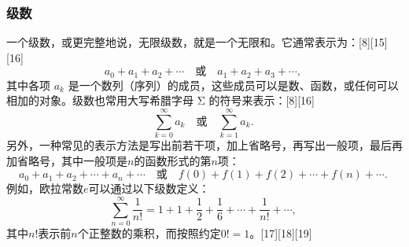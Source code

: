 \subsubsection{级数}
一个级数，或更完整地说，无限级数，就是一个无限和。它通常表示为：[8][15][16]
$$
a_{0} + a_{1} + a_{2} + \cdots \quad \text{或} \quad a_{1} + a_{2} + a_{3} + \cdots ,~
$$
其中各项 $a_{k}$ 是一个数列（序列）的成员，这些成员可以是数、函数，或任何可以相加的对象。级数也常用大写希腊字母 Σ 的符号来表示：[8][16]
$$
\sum_{k=0}^{\infty} a_{k} \quad \text{或} \quad \sum_{k=1}^{\infty} a_{k}.~
$$
另外，一种常见的表示方法是写出前若干项，加上省略号，再写出一般项，最后再加省略号，其中一般项是$n$的函数形式的第$n$项：
$$
a_{0} + a_{1} + a_{2} + \cdots + a_{n} + \cdots 
\quad \text{或} \quad 
f(0) + f(1) + f(2) + \cdots + f(n) + \cdots .~
$$
例如，欧拉常数$e$可以通过以下级数定义：
$$
\sum_{n=0}^{\infty} \frac{1}{n!} 
= 1 + 1 + \frac{1}{2} + \frac{1}{6} + \cdots + \frac{1}{n!} + \cdots ,~
$$
其中$n!$表示前$n$个正整数的乘积，而按照约定$0! = 1$。[17][18][19]


